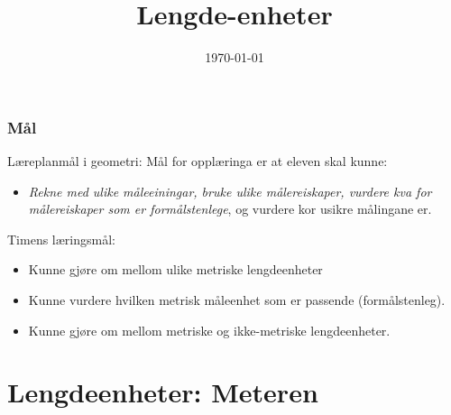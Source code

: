 \documentclass{beamer}
\title{Lengde-enheter}
\date{\today}
\theoremstyle{definition}
\begin{document}
\frame{\titlepage}

\begin{frame}
    \frametitle{Mål}
    Læreplanmål i geometri: Mål for opplæringa er at eleven skal kunne:
    \begin{itemize}
        \item \textit{Rekne med ulike måleeiningar, bruke ulike målereiskaper, vurdere kva for målereiskaper
            som er formålstenlege}, og vurdere kor usikre målingane er.
    \end{itemize}
    Timens læringsmål:
    \begin{itemize}
        \item Kunne gjøre om mellom ulike metriske lengdeenheter
        \item Kunne vurdere hvilken metrisk måleenhet som er passende (formålstenleg).
        \item Kunne gjøre om mellom metriske og ikke-metriske lengdeenheter.
    \end{itemize}
        
\end{frame}


\section{Lengdeenheter: Meteren}

\end{document}
